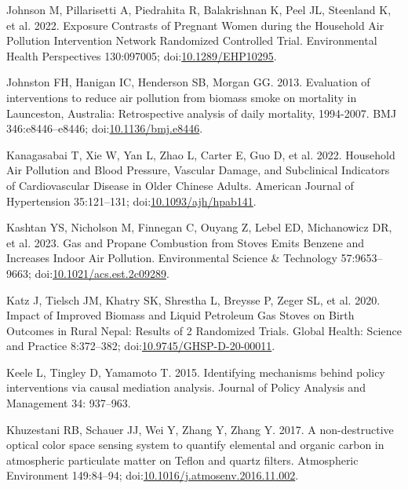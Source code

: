 \documentclass[
  letterpaper,
  DIV=11,
  numbers=noendperiod]{scrartcl}
\newlength{\cslhangindent}
\newenvironment{CSLReferences}[2] %
 {\begin{list}{}{%
  \setlength{\itemindent}{0pt}
  \setlength{\leftmargin}{0pt}
  \setlength{\parsep}{0pt}
  \ifodd #1
   \setlength{\leftmargin}{\cslhangindent}
   \setlength{\itemindent}{-1\cslhangindent}
  \fi
  \setlength{\itemsep}{#2\baselineskip}}}
 {\end{list}}
\begin{document}
\begin{CSLReferences}{1}{1}
Johnson M, Pillarisetti A, Piedrahita R, Balakrishnan K, Peel JL,
Steenland K, et al. 2022. Exposure {Contrasts} of {Pregnant Women}
during the {Household Air Pollution Intervention Network Randomized
Controlled Trial}. Environmental Health Perspectives 130:097005;
doi:\href{https://doi.org/10.1289/EHP10295}{10.1289/EHP10295}.

Johnston FH, Hanigan IC, Henderson SB, Morgan GG. 2013. Evaluation of
interventions to reduce air pollution from biomass smoke on mortality in
{Launceston}, {Australia}: Retrospective analysis of daily mortality,
1994-2007. BMJ 346:e8446--e8446;
doi:\href{https://doi.org/10.1136/bmj.e8446}{10.1136/bmj.e8446}.

Kanagasabai T, Xie W, Yan L, Zhao L, Carter E, Guo D, et al. 2022.
Household {Air Pollution} and {Blood Pressure}, {Vascular Damage}, and
{Subclinical Indicators} of {Cardiovascular Disease} in {Older Chinese
Adults}. American Journal of Hypertension 35:121--131;
doi:\href{https://doi.org/10.1093/ajh/hpab141}{10.1093/ajh/hpab141}.

Kashtan YS, Nicholson M, Finnegan C, Ouyang Z, Lebel ED, Michanowicz DR,
et al. 2023. Gas and {Propane Combustion} from {Stoves Emits Benzene}
and {Increases Indoor Air Pollution}. Environmental Science \&
Technology 57:9653--9663;
doi:\href{https://doi.org/10.1021/acs.est.2c09289}{10.1021/acs.est.2c09289}.

Katz J, Tielsch JM, Khatry SK, Shrestha L, Breysse P, Zeger SL, et al.
2020. Impact of {Improved Biomass} and {Liquid Petroleum Gas Stoves} on
{Birth Outcomes} in {Rural Nepal}: {Results} of 2 {Randomized Trials}.
Global Health: Science and Practice 8:372--382;
doi:\href{https://doi.org/10.9745/GHSP-D-20-00011}{10.9745/GHSP-D-20-00011}.

Keele L, Tingley D, Yamamoto T. 2015. Identifying mechanisms behind
policy interventions via causal mediation analysis. Journal of Policy
Analysis and Management 34: 937--963.

Khuzestani RB, Schauer JJ, Wei Y, Zhang Y, Zhang Y. 2017. A
non-destructive optical color space sensing system to quantify elemental
and organic carbon in atmospheric particulate matter on {Teflon} and
quartz filters. Atmospheric Environment 149:84--94;
doi:\href{https://doi.org/10.1016/j.atmosenv.2016.11.002}{10.1016/j.atmosenv.2016.11.002}.


\end{CSLReferences}
\end{document}
